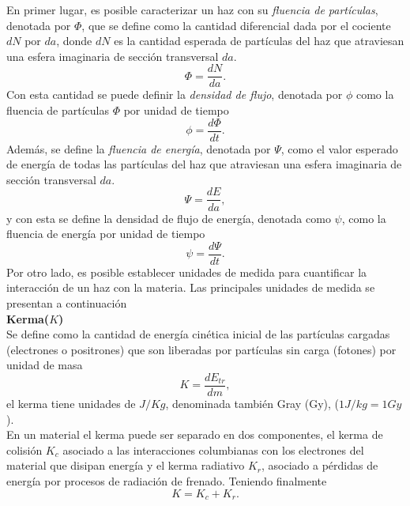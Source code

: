 En primer lugar, es posible caracterizar un haz con su \textit{fluencia de partículas}, denotada por $\Phi $, que se define como la cantidad diferencial dada por el cociente $dN$ por $da$, donde $dN$ es la cantidad esperada de partículas del haz que atraviesan una esfera imaginaria de sección transversal $da$.
\begin{equation}
\Phi=\frac{dN}{da}.
\end{equation}   
Con esta cantidad se puede definir la \textit{densidad de flujo}, denotada por $\phi$ como la fluencia de partículas $\Phi$ por unidad de tiempo
\begin{equation}
\phi=\frac{d\Phi}{dt}.
\end{equation}
Además, se define la \textit{fluencia de energía}, denotada por $\Psi$, como el valor esperado de energía de todas las partículas del haz que atraviesan una esfera imaginaria de sección transversal $da$.
\begin{equation}
\Psi=\frac{dE}{da},
\end{equation}
y con esta se define la densidad de flujo de energía, denotada como $\psi$, como la fluencia de energía por unidad de tiempo
\begin{equation}
\psi=\frac{d\Psi}{dt}.
\end{equation}
Por otro lado, es posible establecer unidades de medida para cuantificar la interacción de un haz con la materia. Las principales unidades de medida se presentan a continuación\\

\noindent
\textbf{Kerma($K$)}\\

Se define como la cantidad de energía cinética inicial de las partículas cargadas (electrones o positrones) que son liberadas por partículas sin carga (fotones) por unidad de masa
\begin{equation}
K=\frac{dE_{tr}}{dm},
\end{equation}
el kerma tiene unidades de $J/Kg$, denominada también Gray (Gy), ($1J/kg=1Gy$).\\


En un material el kerma puede ser separado en dos componentes, el kerma de colisión $K_c$  asociado a las interacciones columbianas con los electrones del material que disipan energía y el kerma radiativo $K_r$, asociado a pérdidas de energía por procesos de radiación de frenado. Teniendo finalmente 
\begin{equation}
	K=K_c+K_r.
\end{equation}\\

